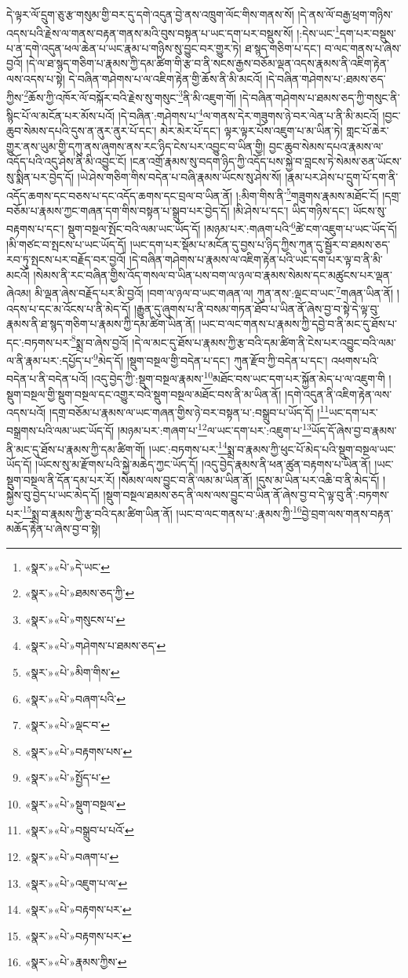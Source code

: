 དེ་ལྟར་ལོ་དྲུག་ཅུ་རྩ་གསུམ་གྱི་བར་དུ་དགེ་འདུན་བྱེ་ནས་འཁྲུག་ལོང་གིས་གནས་སོ། །དེ་ནས་ལོ་བརྒྱ་ཕྲག་གཉིས་འདས་པའི་རྗེས་ལ་གནས་བརྟན་གནས་མའི་བུས་བསྟན་པ་ཡང་དག་པར་བསྡུས་སོ། །:དེས་ཡང་\footnote{«སྣར་»«པེ་»དེ་ཡང་}དག་པར་བསྡུས་པ་ན་དགེ་འདུན་ཕལ་ཆེན་པ་ཡང་རྣམ་པ་གཉིས་སུ་བྱུང་བར་གྱུར་ཏེ། ཐ་སྙད་གཅིག་པ་དང་། བ་ལང་གནས་པ་ཞེས་བྱའོ། །དེ་ལ་ཐ་སྙད་གཅིག་པ་རྣམས་ཀྱི་དམ་ཚིག་གི་རྩ་བ་ནི་སངས་རྒྱས་བཅོམ་ལྡན་འདས་རྣམས་ནི་འཇིག་རྟེན་ལས་འདས་པ་སྟེ། དེ་བཞིན་གཤེགས་པ་ལ་འཇིག་རྟེན་གྱི་ཆོས་ནི་མི་མངའོ། །དེ་བཞིན་གཤེགས་པ་:ཐམས་ཅད་ཀྱིས་\footnote{«སྣར་»«པེ་»ཐམས་ཅད་ཀྱི་}ཆོས་ཀྱི་འཁོར་ལོ་བསྐོར་བའི་རྗེས་སུ་གསུང་\footnote{«སྣར་»«པེ་»གསུངས་པ་}ནི་མི་འཇུག་གོ། །དེ་བཞིན་གཤེགས་པ་ཐམས་ཅད་ཀྱི་གསུང་ནི་སྙིང་པོ་ལ་མངོན་པར་མོས་པའོ། །དེ་བཞིན་:གཤེགས་པ་\footnote{«སྣར་»«པེ་»གཤེགས་པ་ཐམས་ཅད་}ལ་གནས་དེར་གཟུགས་ཉེ་བར་ལེན་པ་ནི་མི་མངའོ། །བྱང་ཆུབ་སེམས་དཔའི་དུས་ན་ནུར་ནུར་པོ་དང་། མེར་མེར་པོ་དང་། ལྟར་ལྟར་པོས་འཇུག་པ་མ་ཡིན་ཏེ། གླང་པོ་ཆེར་གྱུར་ནས་ཡུམ་གྱི་དཀུ་ནས་ཞུགས་ནས་རང་ཉིད་ངེས་པར་འབྱུང་བ་ཡིན་གྱི། བྱང་ཆུབ་སེམས་དཔའ་རྣམས་ལ་འདོད་པའི་འདུ་ཤེས་ནི་མི་འབྱུང་ངོ། །ངན་འགྲོ་རྣམས་སུ་བདག་ཉིད་ཀྱི་འདོད་པས་སྐྱེ་བ་བླངས་ཏེ་སེམས་ཅན་ཡོངས་སུ་སྨིན་པར་བྱེད་དོ། །ཡེ་ཤེས་གཅིག་གིས་བདེན་པ་བཞི་རྣམས་ཡོངས་སུ་ཤེས་སོ། །རྣམ་པར་ཤེས་པ་དྲུག་པོ་དག་ནི་འདོད་ཆགས་དང་བཅས་པ་དང་འདོད་ཆགས་དང་བྲལ་བ་ཡིན་ནོ། །:མིག་གིས་ནི་\footnote{«སྣར་»«པེ་»མིག་གིས་}གཟུགས་རྣམས་མཐོང་ངོ། །དགྲ་བཅོམ་པ་རྣམས་ཀྱང་གཞན་དག་གིས་བསྟན་པ་སྒྲུབ་པར་བྱེད་དོ། །མི་ཤེས་པ་དང་། ཡིད་གཉིས་དང་། ཡོངས་སུ་བརྟགས་པ་དང་། སྡུག་བསྔལ་སྤོང་བའི་ལམ་ཡང་ཡོད་དོ། །མཉམ་པར་:གཞག་པའི་\footnote{«སྣར་»«པེ་»བཞག་པའི་}ཚེ་ངག་འཇུག་པ་ཡང་ཡོད་དོ། །མི་གཙང་བ་སྤངས་པ་ཡང་ཡོད་དོ། །ཡང་དག་པར་སྡོམ་པ་མངོན་དུ་བྱས་པ་ཉིད་ཀྱིས་ཀུན་དུ་སྦྱོར་བ་ཐམས་ཅད་རབ་ཏུ་སྤངས་པར་བརྗོད་བར་བྱའོ། །དེ་བཞིན་གཤེགས་པ་རྣམས་ལ་འཇིག་རྟེན་པའི་ཡང་དག་པར་ལྟ་བ་ནི་མི་མངའོ། །སེམས་ནི་རང་བཞིན་གྱིས་འོད་གསལ་བ་ཡིན་པས་བག་ལ་ཉལ་བ་རྣམས་སེམས་དང་མཚུངས་པར་ལྡན་ཞེའམ། མི་ལྡན་ཞེས་བརྗོད་པར་མི་བྱའོ། །བག་ལ་ཉལ་བ་ཡང་གཞན་ལ། ཀུན་ནས་:ལྡང་བ་ཡང་\footnote{«སྣར་»«པེ་»ལྡང་བ་}གཞན་ཡིན་ནོ། །འདས་པ་དང་མ་འོངས་པ་ནི་མེད་དོ། །རྒྱུན་དུ་ཞུགས་པ་ནི་བསམ་གཏན་ཐོབ་པ་ཡིན་ནོ་ཞེས་བྱ་བ་སྟེ་དེ་ལྟ་བུ་རྣམས་ནི་ཐ་སྙད་གཅིག་པ་རྣམས་ཀྱི་དམ་ཚིག་ཡིན་ནོ། །ཡང་བ་ལང་གནས་པ་རྣམས་ཀྱི་དབྱེ་བ་ནི་མང་དུ་ཐོས་པ་དང་:བཏགས་པར་\footnote{«སྣར་»«པེ་»བརྟགས་པས་}སྨྲ་བ་ཞེས་བྱའོ། །དེ་ལ་མང་དུ་ཐོས་པ་རྣམས་ཀྱི་རྩ་བའི་དམ་ཚིག་ནི་ངེས་པར་འབྱུང་བའི་ལམ་ལ་ནི་རྣམ་པར་:དཔྱོད་པ་\footnote{«སྣར་»«པེ་»སྤྱོད་པ་}མེད་དོ། །སྡུག་བསྔལ་གྱི་བདེན་པ་དང་། ཀུན་རྫོབ་ཀྱི་བདེན་པ་དང་། འཕགས་པའི་བདེན་པ་ནི་བདེན་པའོ། །འདུ་བྱེད་ཀྱི་:སྡུག་བསྔལ་རྣམས་\footnote{«སྣར་»«པེ་»སྡུག་བསྔལ་}མཐོང་བས་ཡང་དག་པར་སྐྱོན་མེད་པ་ལ་འཇུག་གི །སྡུག་བསྔལ་གྱི་སྡུག་བསྔལ་དང་འགྱུར་བའི་སྡུག་བསྔལ་མཐོང་བས་ནི་མ་ཡིན་ནོ། །དགེ་འདུན་ནི་འཇིག་རྟེན་ལས་འདས་པའོ། །དགྲ་བཅོམ་པ་རྣམས་ལ་ཡང་གཞན་གྱིས་ཉེ་བར་བསྟན་པ་:བསྒྲུབ་པ་ཡོད་དོ། །\footnote{«སྣར་»«པེ་»བསྒྲུབ་པ་པའོ་}ཡང་དག་པར་བསྒྲགས་པའི་ལམ་ཡང་ཡོད་དོ། །མཉམ་པར་:གཞག་པ་\footnote{«སྣར་»«པེ་»བཞག་པ་}ལ་ཡང་དག་པར་:འཇུག་པ་\footnote{«སྣར་»«པེ་»འཇུག་པ་ལ་}ཡོད་དོ་ཞེས་བྱ་བ་རྣམས་ནི་མང་དུ་ཐོས་པ་རྣམས་ཀྱི་དམ་ཚིག་གོ། །ཡང་:བཏགས་པར་\footnote{«སྣར་»«པེ་»བརྟགས་པར་}སྨྲ་བ་རྣམས་ཀྱི་ཕུང་པོ་མེད་པའི་སྡུག་བསྔལ་ཡང་ཡོད་དོ། །ཡོངས་སུ་མ་རྫོགས་པའི་སྐྱེ་མཆེད་ཀྱང་ཡོད་དོ། །འདུ་བྱེད་རྣམས་ནི་ཕན་ཚུན་བརྟགས་པ་ཡིན་ནོ། །ཡང་སྡུག་བསྔལ་ནི་དོན་དམ་པར་རོ། །སེམས་ལས་བྱུང་བ་ནི་ལམ་མ་ཡིན་ནོ། །དུས་མ་ཡིན་པར་འཆི་བ་ནི་མེད་དོ། །སྐྱེས་བུ་བྱེད་པ་ཡང་མེད་དོ། །སྡུག་བསྔལ་ཐམས་ཅད་ནི་ལས་ལས་བྱུང་བ་ཡིན་ནོ་ཞེས་བྱ་བ་དེ་ལྟ་བུ་ནི་:བཏགས་པར་\footnote{«སྣར་»«པེ་»བརྟགས་པར་}སྨྲ་བ་རྣམས་ཀྱི་རྩ་བའི་དམ་ཚིག་ཡིན་ནོ། །ཡང་བ་ལང་གནས་པ་:རྣམས་ཀྱི་\footnote{«སྣར་»«པེ་»རྣམས་ཀྱིས་}བྱེ་བྲག་ལས་གནས་བརྟན་མཆོད་རྟེན་པ་ཞེས་བྱ་བ་སྟེ། 